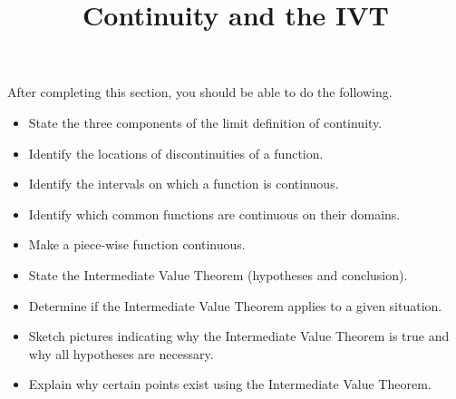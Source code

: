 \documentclass{ximera}
\title{Continuity and the IVT}
\begin{document}
\begin{abstract}
\end{abstract}

\maketitle

\begin{sectionOutcomes}
After completing this section, you should be able to do the following.

\begin{itemize}
\item State the three components of the limit definition of continuity. 
\item Identify the locations of discontinuities of a function. 
\item Identify the intervals on which a function is continuous.
\item Identify which common functions are continuous on their domains.
\item Make a piece-wise function continuous.
\item State the Intermediate Value Theorem (hypotheses and conclusion).
\item Determine if the Intermediate Value Theorem applies to a given situation.
\item Sketch pictures indicating why the Intermediate Value Theorem is
  true and why all hypotheses are necessary.
\item Explain why certain points exist using the Intermediate Value
  Theorem.
\end{itemize}

\end{sectionOutcomes}
\end{document}
